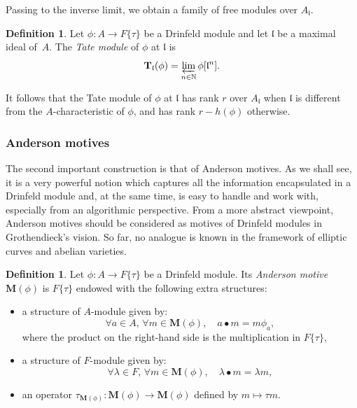 \documentclass[11pt]{article}
\theoremstyle{definition}
\newtheorem{definition}[theorem]{Definition}
\newcommand\N{\mathbb{N}}
\newcommand{\MM}{\mathbf{M}}
\newcommand{\Tl}{\mathbf{T}_{\mathfrak l}}
\begin{document}
Passing to the inverse limit, we obtain a family of free modules over $A_{\mathfrak l}$.

\begin{definition}
\label{definition:tate-module}
Let $\phi : A \to F\{\tau\}$ be a Drinfeld module and
let $\mathfrak l$ be a maximal ideal of~$A$.
The \emph{Tate module} of $\phi$ at $\mathfrak l$ is
\[
  \Tl(\phi) = \varprojlim_{n \in \N} \phi[\mathfrak{l}^n].
\]
\end{definition}

It follows that the Tate module of $\phi$ at $\mathfrak l$ has rank $r$ over $A_\mathfrak{l}$ when $\mathfrak l$ is different from the $A$-characteristic of $\phi$, and has rank $r-h(\phi)$ otherwise.

\subsubsection{Anderson motives}
\label{sssec:motives}

The second important construction is that of Anderson
motives. As we shall see, it is a very powerful notion which captures all the information encapsulated in a Drinfeld module and, at the same time, is easy to handle and work with, especially from an algorithmic perspective.
From a more abstract viewpoint, Anderson motives should be
considered as motives of Drinfeld modules in Grothendieck's vision.
So far, no analogue is known in the framework of elliptic curves and
abelian varieties.

\begin{definition}
\label{def:anderson-motive}
Let $\phi: A \to F\{\tau\}$ be a Drinfeld module. Its \emph{Anderson motive} $\MM(\phi)$ is $F\{\tau\}$ endowed with the following extra
structures:
\begin{itemize}
\item a structure of $A$-module given by:
$$\forall a \in A,\, \forall m \in \MM(\phi), \quad
a \bullet m = m \phi_a,$$
where the product on the right-hand side is the multiplication
in $F\{\tau\}$,
\item a structure of $F$-module given by:
$$\forall \lambda \in F,\, \forall m \in \MM(\phi), \quad
\lambda \bullet m = \lambda m,$$
\item an operator $\tau_{\MM(\phi)} : \MM(\phi) \to \MM(\phi)$
defined by $m \mapsto \tau m$.
\end{itemize}
\end{definition}
\end{document}
